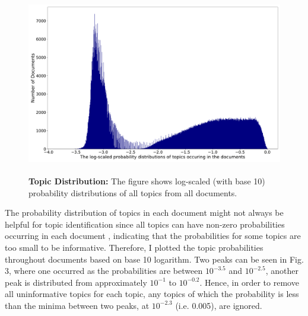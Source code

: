 \begin{figure}[H]
    \centering
    \includegraphics[width = 14cm, height = 8cm]{./img/distri_doc_word_counts.pdf}
    \caption[Probability distributions of all topics from all documents]{\textbf{Topic Distribution:} The figure shows log-scaled (with base 10) probability distributions of all topics from all documents.}
\end{figure}

The probability distribution of topics in each document might not always be helpful for topic identification since all topics can have non-zero probabilities occurring in each document \cite{LDA}, indicating that the probabilities for some topics are too small to be informative. Therefore, I plotted the topic probabilities throughout documents based on base 10 logarithm. Two peaks can be seen in Fig. 3, where one occurred as the probabilities are between $10^{-3.5}$ and $10^{-2.5}$, another peak is distributed from approximately $10^{-1}$ to $10^{-0.2}$. Hence, in order to remove all uninformative topics for each topic, any topics of which the probability is less than the minima between two peaks, at $10^{-2.3}$ (i.e. 0.005), are ignored.

